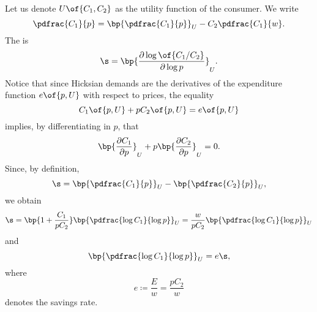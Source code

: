 Let us denote $U\of{C_1, C_2}$ as the utility function of the consumer. We write 
\begin{equation}
    \notag 
    \pdfrac{C_1}{p} = \bp{\pdfrac{C_1}{p}}_{U} - C_2 \pdfrac{C_1}{w}.
\end{equation}
The  is 
\begin{equation}
    \notag 
    \s = \bp{\frac{\partial \log\of{C_1 / C_2}}{\partial \log p}}_{U}.
\end{equation}
Notice that since Hicksian demands are the derivatives of the expenditure function $e\of{p, U}$ with respect to prices, the equality 
\begin{equation}
    \notag 
    C_1\of{p, U} + p C_2\of{p, U} = e\of{p, U}
\end{equation}
implies, by differentiating in $p$, that 
\begin{equation}
    \notag 
    \bp{\frac{\partial C_1}{\partial p}}_{U} + p \bp{\frac{\partial C_2}{\partial p}}_{U} = 0.
\end{equation}
Since, by definition, 
\begin{equation}
    \notag 
    \s = \bp{\pdfrac{C_1}{p}}_{U} - \bp{\pdfrac{C_2}{p}}_{U},
\end{equation}
we obtain 
\begin{equation}
    \notag 
    \s = \bp{1 + \frac{C_1}{p C_2}} \bp{\pdfrac{\log C_1}{\log p}}_{U} = \frac{w}{p C_2} \bp{\pdfrac{\log C_1}{\log p}}_{U}
\end{equation}
and 
\begin{equation}
    \notag 
    \bp{\pdfrac{\log C_1}{\log p}}_{U} = e \s,
\end{equation}
where $$e \coloneqq \frac{E}{w} = \frac{p C_2}{w}$$ denotes the savings rate.

